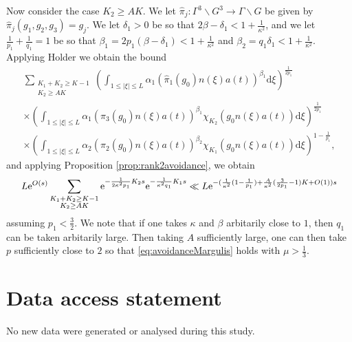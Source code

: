 \documentclass[12pt]{amsart}
\theoremstyle{definition}
\theoremstyle{remark}
\numberwithin{equation}{section}
\newcommand{\dd}{\mathrm{d}}
\newcommand{\e}{\mathrm{e}}
\begin{document}
Now consider the case $K_2 \geq AK$.
We let $\hat\pi_j : \Gamma^3 \backslash G^3 \to \Gamma\backslash G $ be given by $\hat\pi_j(g_1,g_2,g_3) = g_j$.
We let $\delta_1 > 0$ be so that $2\beta - \delta_1 < 1 + \tfrac{1}{\kappa^2}$, and we let $\tfrac{1}{p_1} + \tfrac{1}{q_1} = 1$ be so that $\beta_1 = 2p_1(\beta - \delta_1) < 1 + \tfrac{1}{\kappa^2}$ and $\beta_2 = q_1 \delta_1 < 1 + \tfrac{1}{\kappa^2}$.
Applying Holder we obtain the bound
\begin{multline}
  \label{eq:verysmalleta2}
  \sum_{\substack{K_1 + K_2 \geq K-1 \\ K_2 \geq AK}} \left(\int_{1\leq |\xi| \leq L} \alpha_1(\hat\pi_1(g_0)n(\xi) a(t))^{\beta_1}\dd \xi\right)^{\frac{1}{2p_1}} \\
    \times \left(\int_{1\leq |\xi| \leq L} \alpha_1(\hat\pi_3(g_0)n(\xi) a(t))^{\beta_1} \chi_{K_2}(g_0n(\xi)a(t)) \dd \xi\right)^{\frac{1}{2p_1}} \\
  \times \left(\int_{1\leq |\xi| \leq L} \alpha_2(\pi_2(g_0)n(\xi) a(t))^{\beta_2} \chi_{K_1}(g_0n(\xi)a(t)) \dd \xi\right)^{1 - \frac{1}{p_1}},
\end{multline}
and applying Proposition \ref{prop:rank2avoidance}, we obtain
\begin{equation}
  \label{eq:verysmalleta2eta1sum}
  L \e^{O(s)}\sum_{\substack{K_1 + K_2 \geq K-1 \\ K_2 \geq AK}}  \e^{-\frac{1}{2\kappa^2p_1}K_2s} \e^{-\frac{1}{\kappa^2q_1}K_1s} \\
  \ll L \e^{-(\frac{1}{\kappa^2}(1 - \frac{1}{p_1}) + \frac{A}{\kappa^2}(\frac{3}{2 p_1} - 1)K + O(1))s}
\end{equation}
assuming $p_1 < \tfrac{3}{2}$. 
We note that if one takes $\kappa$ and $\beta$ arbitarily close to $1$, then $q_1$ can be taken arbitarily large.
Then taking $A$ sufficiently large, one can then take $p$ sufficiently close to $2$ so that \eqref{eq:avoidanceMargulis} holds with $\mu > \tfrac{1}{3}$.

\section*{Data access statement}
No new data were generated or analysed during this study.



\def\cprime{$'$} \def\cprime{$'$} \def\cprime{$'$}
\providecommand{\bysame}{\leavevmode\hbox to3em{\hrulefill}\thinspace}
\providecommand{\MR}{\relax\ifhmode\unskip\space\fi MR }
\providecommand{\MRhref}[2]{%
  \href{http://www.ams.org/mathscinet-getitem?mr=#1}{#2}
}
\end{document}
